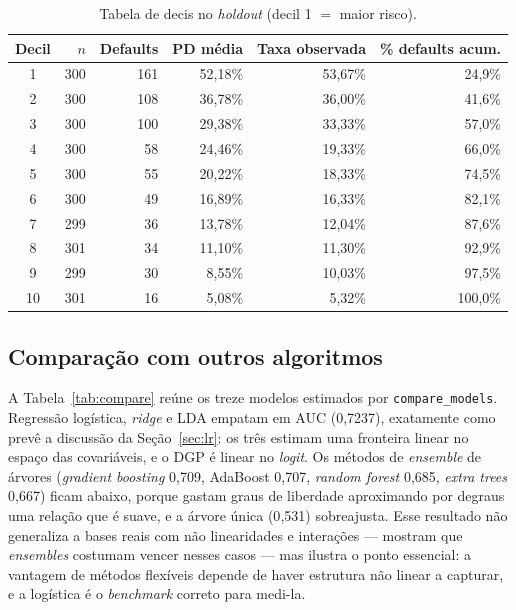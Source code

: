 \documentclass[11pt,a4paper]{article}
\newcommand{\code}[1]{\texttt{#1}}
\begin{document}
\begin{table}[H]
\centering\small
\caption{Tabela de decis no \emph{holdout} (decil 1 $=$ maior risco).}
\label{tab:decis}
\begin{tabular}{crrrrr}
\toprule
Decil & $n$ & Defaults & PD média & Taxa observada & \% defaults acum. \\
\midrule
1 & 300 & 161 & 52,18\% & 53,67\% & 24,9\% \\
2 & 300 & 108 & 36,78\% & 36,00\% & 41,6\% \\
3 & 300 & 100 & 29,38\% & 33,33\% & 57,0\% \\
4 & 300 & 58 & 24,46\% & 19,33\% & 66,0\% \\
5 & 300 & 55 & 20,22\% & 18,33\% & 74,5\% \\
6 & 300 & 49 & 16,89\% & 16,33\% & 82,1\% \\
7 & 299 & 36 & 13,78\% & 12,04\% & 87,6\% \\
8 & 301 & 34 & 11,10\% & 11,30\% & 92,9\% \\
9 & 299 & 30 & 8,55\% & 10,03\% & 97,5\% \\
10 & 301 & 16 & 5,08\% & 5,32\% & 100,0\% \\
\bottomrule
\end{tabular}
\end{table}

\subsection{Comparação com outros algoritmos}
\label{sec:compare}

A Tabela~\ref{tab:compare} reúne os treze modelos estimados por \code{compare\_models}. Regressão logística, \emph{ridge} e LDA empatam em AUC (0{,}7237), exatamente como prevê a discussão da Seção~\ref{sec:lr}: os três estimam uma fronteira linear no espaço das covariáveis, e o DGP é linear no \emph{logit}. Os métodos de \emph{ensemble} de árvores (\emph{gradient boosting} 0{,}709, AdaBoost 0{,}707, \emph{random forest} 0{,}685, \emph{extra trees} 0{,}667) ficam abaixo, porque gastam graus de liberdade aproximando por degraus uma relação que é suave, e a árvore única (0{,}531) sobreajusta. Esse resultado não generaliza a bases reais com não linearidades e interações --- \citet{lessmann2015} mostram que \emph{ensembles} costumam vencer nesses casos --- mas ilustra o ponto essencial: a vantagem de métodos flexíveis depende de haver estrutura não linear a capturar, e a logística é o \emph{benchmark} correto para medi-la.
\end{document}

